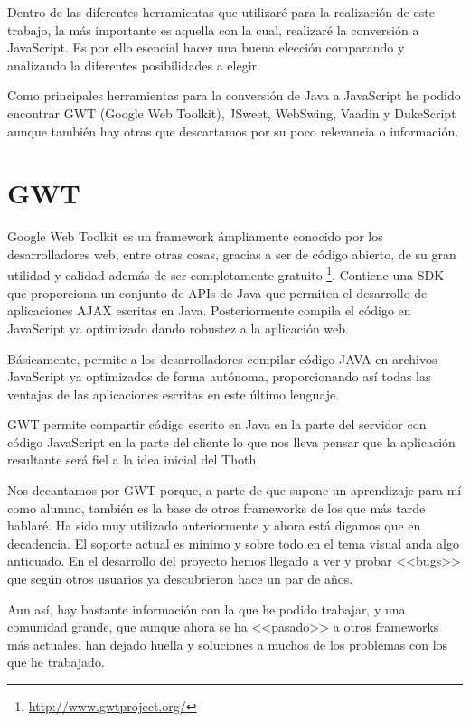 
Dentro de las diferentes herramientas que utilizaré para la realización de este trabajo, la más importante es aquella con la cual, realizaré la conversión a JavaScript. Es por ello esencial hacer una buena elección comparando y analizando la diferentes posibilidades a elegir.

Como principales herramientas para la conversión de Java a JavaScript he podido encontrar GWT (Google Web Toolkit), JSweet, WebSwing, Vaadin y DukeScript aunque también hay otras que descartamos por su poco relevancia o información.

\section{GWT}

Google Web Toolkit es un framework ámpliamente conocido por los desarrolladores web, entre otras cosas, gracias a ser de código abierto, de su gran utilidad y calidad además de ser completamente gratuito \footnote{\url{http://www.gwtproject.org/}}.
Contiene una SDK que proporciona un conjunto de APIs de Java que permiten el desarrollo de aplicaciones AJAX escritas en Java. Posteriormente compila el código en JavaScript ya optimizado dando robustez a la aplicación web.

Básicamente, permite a los desarrolladores compilar código JAVA en archivos JavaScript ya optimizados de forma autónoma, proporcionando así todas las ventajas de las aplicaciones escritas en este último lenguaje. 

GWT permite compartir código escrito en Java en la parte del servidor con código JavaScript en la parte del cliente lo que nos lleva pensar que la aplicación resultante será fiel a la idea inicial del Thoth. 

Nos decantamos por GWT porque, a parte de que supone un aprendizaje para mí como alumno, también es la base de otros frameworks de los que más tarde hablaré. Ha sido muy utilizado anteriormente y ahora está digamos que en decadencia. El soporte actual es mínimo y sobre todo en el tema visual anda algo anticuado. En el desarrollo del proyecto hemos llegado a ver  y probar <<bugs>> que según otros usuarios ya descubrieron hace un par de años.

Aun así, hay bastante información con la que he podido trabajar, y una comunidad grande, que aunque ahora se ha <<pasado>> a otros frameworks más actuales, han dejado huella y soluciones a muchos de los problemas con los que he trabajado.

